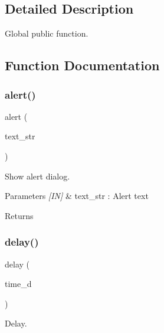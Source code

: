 \subsection{Detailed Description}
Global public function. 



\subsection{Function Documentation}
\mbox{\label{group___public__function_ga230c3c1cc5c4ce9a643905e97126c9e3}} 
\subsubsection{alert()}
{\footnotesize\ttfamily alert (\begin{DoxyParamCaption}\item[{text\+\_\+str}]{ }\end{DoxyParamCaption})}



Show alert dialog. 


\begin{DoxyCode}{0}
\end{DoxyCode}



\begin{DoxyParams}{Parameters}
{\em \mbox{[}\+I\+N\mbox{]}} & text\+\_\+str \+: Alert text \\
\hline
\end{DoxyParams}
\begin{DoxyReturn}{Returns}

\end{DoxyReturn}
\mbox{\label{group___public__function_ga41aacc7d9f6801c5df26b1362e0385b0}} 
\subsubsection{delay()}
{\footnotesize\ttfamily delay (\begin{DoxyParamCaption}\item[{time\+\_\+d}]{ }\end{DoxyParamCaption})}



Delay. 


